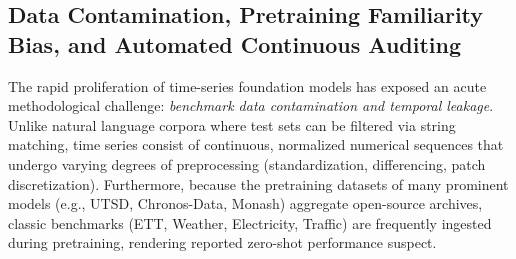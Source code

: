 \subsection{Data Contamination, Pretraining Familiarity Bias, and Automated Continuous Auditing}
\label{sec:data_contamination_auditing}

The rapid proliferation of time-series foundation models has exposed an acute methodological challenge: \emph{benchmark data contamination and temporal leakage}. Unlike natural language corpora where test sets can be filtered via string matching, time series consist of continuous, normalized numerical sequences that undergo varying degrees of preprocessing (standardization, differencing, patch discretization). Furthermore, because the pretraining datasets of many prominent models (e.g., UTSD, Chronos-Data, Monash) aggregate open-source archives, classic benchmarks (ETT, Weather, Electricity, Traffic) are frequently ingested during pretraining, rendering reported zero-shot performance suspect.

